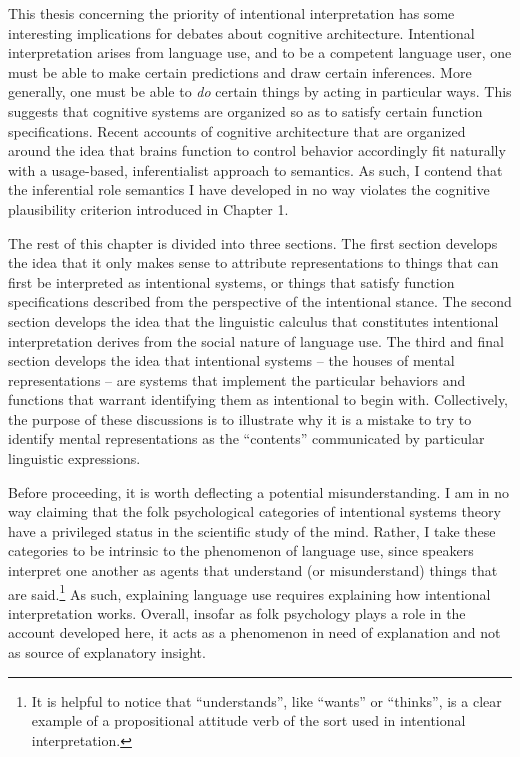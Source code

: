 This thesis concerning the priority of intentional interpretation has some interesting implications for debates about cognitive architecture. Intentional interpretation arises from language use, and to be a competent language user, one must be able to make certain predictions and draw certain inferences. More generally, one must be able to \textit{do} certain things by acting in particular ways. This suggests that cognitive systems are organized so as to satisfy certain function specifications. Recent accounts of cognitive architecture that are organized around the idea that brains function to control behavior \citep[e.g.,][]{Eliasmith:2003,Eliasmith:2013} accordingly fit naturally with a usage-based, inferentialist approach to semantics. As such, I contend that the inferential role semantics I have developed in no way violates the cognitive plausibility criterion introduced in Chapter 1.  

The rest of this chapter is divided into three sections. The first section develops the idea that it only makes sense to attribute representations to things that can first be interpreted as intentional systems, or things that satisfy function specifications described from the perspective of the intentional stance. The second section develops the idea that the linguistic calculus that constitutes intentional interpretation derives from the social nature of language use. The third and final section develops the idea that intentional systems -- the houses of mental representations -- are systems that implement the particular behaviors and functions that warrant identifying them as intentional to begin with. Collectively, the purpose of these discussions is to illustrate why it is a mistake to try to identify mental representations as the ``contents'' communicated by particular linguistic expressions.

Before proceeding, it is worth deflecting a potential misunderstanding. I am in no way claiming that the folk psychological categories of intentional systems theory have a privileged status in the scientific study of the mind. Rather, I take these categories to be intrinsic to the phenomenon of language use, since speakers interpret one another as agents that understand (or misunderstand) things that are said.\footnote{It is helpful to notice that ``understands'', like ``wants'' or ``thinks'', is a clear example of a propositional attitude verb of the sort used in intentional interpretation.} As such, explaining language use requires explaining how intentional interpretation works. Overall, insofar as folk psychology plays a role in the account developed here, it acts as a phenomenon in need of explanation and not as source of explanatory insight. 

